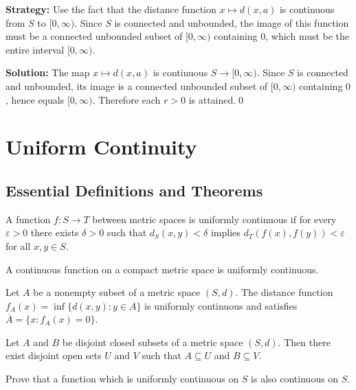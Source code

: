 \noindent\textbf{Strategy:} Use the fact that the distance function $x \mapsto d(x,a)$ is continuous from $S$ to $[0,\infty)$. Since $S$ is connected and unbounded, the image of this function must be a connected unbounded subset of $[0,\infty)$ containing $0$, which must be the entire interval $[0,\infty)$.

\bigskip\noindent\textbf{Solution:}
The map $x\mapsto d(x,a)$ is continuous $S\to[0,\infty)$. Since $S$ is connected and unbounded, its image is a connected unbounded subset of $[0,\infty)$ containing $0$, hence equals $[0,\infty)$. Therefore each $r>0$ is attained.\qed

\section{Uniform Continuity}

\subsection*{Essential Definitions and Theorems}

\begin{definition}
A function $f: S \to T$ between metric spaces is uniformly continuous if for every $\varepsilon > 0$ there exists $\delta > 0$ such that $d_S(x,y) < \delta$ implies $d_T(f(x), f(y)) < \varepsilon$ for all $x,y \in S$.
\end{definition}

\begin{theorem}
A continuous function on a compact metric space is uniformly continuous.
\end{theorem}

\begin{theorem}
Let $A$ be a nonempty subset of a metric space $(S,d)$. The distance function $f_A(x) = \inf\{d(x,y) : y \in A\}$ is uniformly continuous and satisfies $\overline{A} = \{x : f_A(x) = 0\}$.
\end{theorem}

\begin{theorem}
Let $A$ and $B$ be disjoint closed subsets of a metric space $(S,d)$. Then there exist disjoint open sets $U$ and $V$ such that $A \subseteq U$ and $B \subseteq V$.
\end{theorem}



\begin{problembox}
\begin{problemstatement}
Prove that a function which is uniformly continuous on $S$ is also continuous on $S$.
\end{problemstatement}
\end{problembox}

